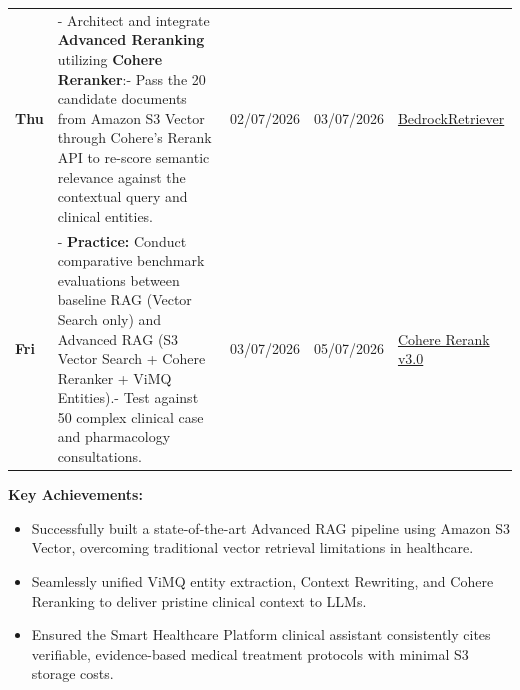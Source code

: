 \begin{longtable}[]
{API} \\
\textbf{Thu} & - Architect and integrate \textbf{Advanced Reranking}
utilizing \textbf{Cohere Reranker}:- Pass the 20 candidate documents
from Amazon S3 Vector through Cohere's Rerank API to re-score semantic
relevance against the contextual query and clinical entities. &
02/07/2026 & 03/07/2026 &
\href{https://python.langchain.com/v0.2/docs/integrations/retrievers/bedrock/}{BedrockRetriever} \\
\textbf{Fri} & - \textbf{Practice:} Conduct comparative benchmark
evaluations between baseline RAG (Vector Search only) and Advanced RAG
(S3 Vector Search + Cohere Reranker + ViMQ Entities).- Test against 50
complex clinical case and pharmacology consultations. & 03/07/2026 &
05/07/2026 & \href{https://docs.cohere.com/docs/rerank-2}{Cohere Rerank
v3.0} \\
\end{longtable}
\endgroup

\vspace{0.5em}\noindent\textbf{Key Achievements:}

\begin{itemize}
\tightlist
\item
  Successfully built a state-of-the-art Advanced RAG pipeline using
  Amazon S3 Vector, overcoming traditional vector retrieval limitations
  in healthcare.
\item
  Seamlessly unified ViMQ entity extraction, Context Rewriting, and
  Cohere Reranking to deliver pristine clinical context to LLMs.
\item
  Ensured the Smart Healthcare Platform clinical assistant consistently
  cites verifiable, evidence-based medical treatment protocols with
  minimal S3 storage costs.
\end{itemize}
